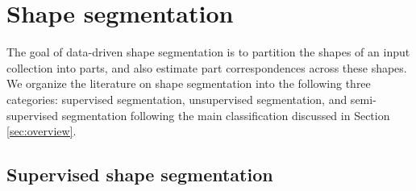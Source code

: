 \section{Shape segmentation}
\label{sec:segmentation}

The goal of data-driven shape segmentation is to partition the shapes of an input collection into parts, and also estimate part correspondences across these shapes. We organize the literature on shape segmentation into the following three categories: supervised segmentation, unsupervised segmentation, and semi-supervised segmentation following the main classification discussed in Section \ref{sec:overview}. 





\subsection{Supervised shape segmentation}

